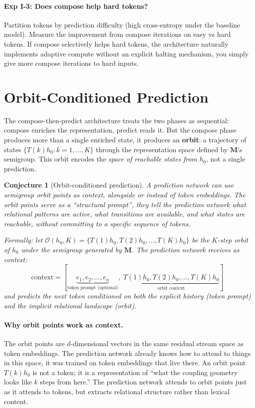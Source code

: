 \documentclass[11pt, a4paper]{article}
\newcommand{\M}{\mathbf{M}}
\theoremstyle{plain}
\newtheorem{conjecture}{Conjecture}
\theoremstyle{definition}
\theoremstyle{remark}
\begin{document}
\paragraph{Exp I-3: Does compose help hard tokens?}
Partition tokens by prediction difficulty (high cross-entropy under the baseline model).
Measure the improvement from compose iterations on easy vs hard tokens.
If compose selectively helps hard tokens, the architecture naturally implements adaptive compute without an explicit halting mechanism, you simply give more compose iterations to hard inputs.

\section{Orbit-Conditioned Prediction}\label{sec:orbit-context}

The compose-then-predict architecture treats the two phases as sequential: compose enriches the representation, predict reads it.
But the compose phase produces more than a single enriched state, it produces an \textbf{orbit}: a trajectory of states $\{T(k)h_0 : k = 1, \ldots, K\}$ through the representation space defined by $\M$'s semigroup.
This orbit encodes the \emph{space of reachable states from $h_0$}, not a single prediction.

\begin{conjecture}[Orbit-conditioned prediction]
A prediction network can use semigroup orbit points as context, alongside or instead of token embeddings.
The orbit points serve as a ``structural prompt'', they tell the prediction network what relational patterns are active, what transitions are available, and what states are reachable, without committing to a specific sequence of tokens.

Formally: let $\mathcal{O}(h_0, K) = \{T(1)h_0, T(2)h_0, \ldots, T(K)h_0\}$ be the $K$-step orbit of $h_0$ under the semigroup generated by $\M$.
The prediction network receives as context:
\[
\text{context} = [\underbrace{e_1, e_2, \ldots, e_n}_{\text{token prompt (optional)}}, \; \underbrace{T(1)h_0, T(2)h_0, \ldots, T(K)h_0}_{\text{orbit context}}]
\]
and predicts the next token conditioned on both the explicit history (token prompt) and the implicit relational landscape (orbit).
\end{conjecture}

\paragraph{Why orbit points work as context.}
The orbit points are $d$-dimensional vectors in the same residual stream space as token embeddings.
The prediction network already knows how to attend to things in this space, it was trained on token embeddings that live there.
An orbit point $T(k)h_0$ is not a token; it is a representation of ``what the coupling geometry looks like $k$ steps from here.''
The prediction network attends to orbit points just as it attends to tokens, but extracts relational structure rather than lexical content.
\end{document}
